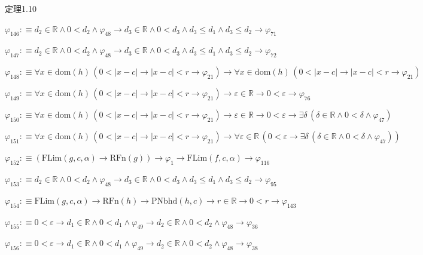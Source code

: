\begin{fullproof}{定理1.10}
\begin{abbrevlist}
\item $\varphi_{146} :\equiv d_{2} \in \mathbb{R} \land 0 < d_{2} \land \varphi_{48} \to d_{3} \in \mathbb{R} \land 0 < d_{3} \land d_{3} \leq d_{1} \land d_{3} \leq d_{2} \to \varphi_{71}$
\item $\varphi_{147} :\equiv d_{2} \in \mathbb{R} \land 0 < d_{2} \land \varphi_{48} \to d_{3} \in \mathbb{R} \land 0 < d_{3} \land d_{3} \leq d_{1} \land d_{3} \leq d_{2} \to \varphi_{72}$
\item $\varphi_{148} :\equiv \forall x \in \mathrm{dom}(h)\,(0 < \lvert x - c \rvert \to \lvert x - c \rvert < r \to \varphi_{21}) \to \forall x \in \mathrm{dom}(h)\,(0 < \lvert x - c \rvert \to \lvert x - c \rvert < r \to \varphi_{21})$
\item $\varphi_{149} :\equiv \forall x \in \mathrm{dom}(h)\,(0 < \lvert x - c \rvert \to \lvert x - c \rvert < r \to \varphi_{21}) \to \varepsilon \in \mathbb{R} \to 0 < \varepsilon \to \varphi_{76}$
\item $\varphi_{150} :\equiv \forall x \in \mathrm{dom}(h)\,(0 < \lvert x - c \rvert \to \lvert x - c \rvert < r \to \varphi_{21}) \to \varepsilon \in \mathbb{R} \to 0 < \varepsilon \to \exists \delta\,(\delta \in \mathbb{R} \land 0 < \delta \land \varphi_{47})$
\item $\varphi_{151} :\equiv \forall x \in \mathrm{dom}(h)\,(0 < \lvert x - c \rvert \to \lvert x - c \rvert < r \to \varphi_{21}) \to \forall \varepsilon \in \mathbb{R}\,(0 < \varepsilon \to \exists \delta\,(\delta \in \mathbb{R} \land 0 < \delta \land \varphi_{47}))$
\item $\varphi_{152} :\equiv (\mathrm{FLim}(g,c,\alpha) \to \mathrm{RFn}(g)) \to \varphi_{1} \to \mathrm{FLim}(f,c,\alpha) \to \varphi_{116}$
\item $\varphi_{153} :\equiv d_{2} \in \mathbb{R} \land 0 < d_{2} \land \varphi_{48} \to d_{3} \in \mathbb{R} \land 0 < d_{3} \land d_{3} \leq d_{1} \land d_{3} \leq d_{2} \to \varphi_{95}$
\item $\varphi_{154} :\equiv \mathrm{FLim}(g,c,\alpha) \to \mathrm{RFn}(h) \to \mathrm{PNbhd}(h,c) \to r \in \mathbb{R} \to 0 < r \to \varphi_{143}$
\item $\varphi_{155} :\equiv 0 < \varepsilon \to d_{1} \in \mathbb{R} \land 0 < d_{1} \land \varphi_{49} \to d_{2} \in \mathbb{R} \land 0 < d_{2} \land \varphi_{48} \to \varphi_{36}$
\item $\varphi_{156} :\equiv 0 < \varepsilon \to d_{1} \in \mathbb{R} \land 0 < d_{1} \land \varphi_{49} \to d_{2} \in \mathbb{R} \land 0 < d_{2} \land \varphi_{48} \to \varphi_{38}$

\end{abbrevlist}
\end{fullproof}
